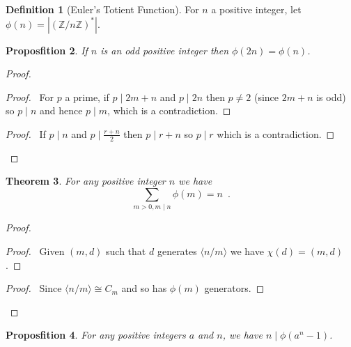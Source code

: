 \documentclass{book}
\let\qed\relax
\newtheorem{prop}{Proposfition}[chapter]
\newtheorem{thm}[prop]{Theorem}
\theoremstyle{definition}
\newtheorem{df}[prop]{Definition}
\begin{document}
\begin{df}[Euler's Totient Function]
    For $n$ a positive integer, let $\phi(n) = |(\mathbb{Z} / n \mathbb{Z})^*|$.
\end{df}

\begin{prop}
    If $n$ is an odd positive integer then $\phi(2n) = \phi(n)$.
\end{prop}

\begin{proof}
    \pf
    \begin{proof}
        \pf\ For $p$ a prime, if $p \mid 2m+n$ and $p \mid 2n$ then $p \neq 2$ (since $2m+n$ is odd) so $p \mid n$ and hence $p \mid m$, which is a contradiction.
    \end{proof}
    \begin{proof}
        \pf\ If $p \mid n$ and $p \mid \frac{r + n}{2}$ then $p \mid r + n$ so $p \mid r$ which is a contradiction.
    \end{proof}
    \qed
\end{proof}

\begin{thm}
For any positive integer $n$ we have
\[ \sum_{m > 0, m \mid n} \phi(m) = n \enspace . \]
\end{thm}

\begin{proof}
\pf
{}
\begin{proof}
\pf\ Given $(m,d)$ such that $d$ generates $\langle n/m \rangle$ we have $\chi(d) = (m,d)$.
\end{proof}
\begin{proof}
\pf\ Since $\langle n/m \rangle \cong C_m$ and so has $\phi(m)$ generators.
\end{proof}
\qed
\end{proof}

\begin{prop}
For any positive integers $a$ and $n$, we have $n \mid \phi(a^n - 1)$.
\end{prop}
\end{document}
